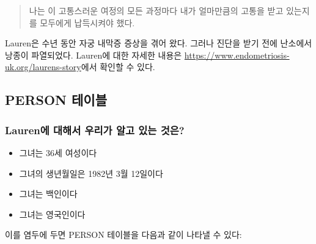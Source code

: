 \documentclass[10.5pt]{book}
\providecommand{\tightlist}{%
  \setlength{\itemsep}{0pt}\setlength{\parskip}{0pt}}
\theoremstyle{definition}
\theoremstyle{definition}
\theoremstyle{definition}
\theoremstyle{remark}
\begin{document}
\begin{quote}
나는 이 고통스러운 여정의 모든 과정마다 내가 얼마만큼의 고통을 받고
있는지를 모두에게 납득시켜야 했다.
\end{quote}

Lauren은 수년 동안 자궁 내막증 증상을 겪어 왔다. 그러나 진단을 받기 전에
난소에서 낭종이 파열되었다. Lauren에 대한 자세한 내용은
\url{https://www.endometriosis-uk.org/laurens-story}에서 확인할 수 있다.

\subsection{PERSON 테이블}\label{person}

\subsubsection*{Lauren에 대해서 우리가 알고 있는
것은?}\label{lauren-----}

\begin{itemize}
\tightlist
\item
  그녀는 36세 여성이다
\item
  그녀의 생년월일은 1982년 3월 12일이다
\item
  그녀는 백인이다
\item
  그녀는 영국인이다
\end{itemize}

이를 염두에 두면 PERSON 테이블을 다음과 같이 나타낼 수 있다:
\end{document}
